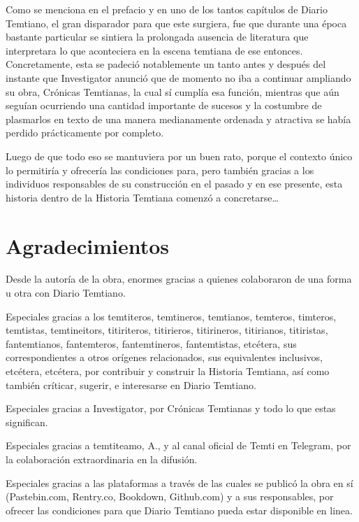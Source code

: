 \documentclass[
]{book}
\begin{document}
Como se menciona en el prefacio y en uno de los tantos capítulos de Diario Temtiano, el gran disparador para que este surgiera, fue que durante una época bastante particular se sintiera la prolongada ausencia de literatura que interpretara lo que aconteciera en la escena temtiana de ese entonces. Concretamente, esta se padeció notablemente un tanto antes y después del instante que Investigator anunció que de momento no iba a continuar ampliando su obra, Crónicas Temtianas, la cual sí cumplía esa función, mientras que aún seguían ocurriendo una cantidad importante de sucesos y la costumbre de plasmarlos en texto de una manera medianamente ordenada y atractiva se había perdido prácticamente por completo.

Luego de que todo eso se mantuviera por un buen rato, porque el contexto único lo permitiría y ofrecería las condiciones para, pero también gracias a los individuos responsables de su construcción en el pasado y en ese presente, esta historia dentro de la Historia Temtiana comenzó a concretarse\ldots{}

\hypertarget{agradecimientos}{%
\section*{Agradecimientos}\label{agradecimientos}}

Desde la autoría de la obra, enormes gracias a quienes colaboraron de una forma u otra con Diario Temtiano.

Especiales gracias a los temtiteros, temtineros, temtianos, temteros, timteros, temtistas, temtineitors, titiriteros, titirieros, titirineros, titirianos, titiristas, fantemtianos, fantemteros, fantemtineros, fantemtistas, etcétera, sus correspondientes a otros orígenes relacionados, sus equivalentes inclusivos, etcétera, etcétera, por contribuir y construir la Historia Temtiana, así como también críticar, sugerir, e interesarse en Diario Temtiano.

Especiales gracias a Investigator, por Crónicas Temtianas y todo lo que estas significan.

Especiales gracias a temtiteamo, A., y al canal oficial de Temti en Telegram, por la colaboración extraordinaria en la difusión.

Especiales gracias a las plataformas a través de las cuales se publicó la obra en sí (Pastebin.com, Rentry.co, Bookdown, Github.com) y a sus responsables, por ofrecer las condiciones para que Diario Temtiano pueda estar disponible en linea.
\end{document}
